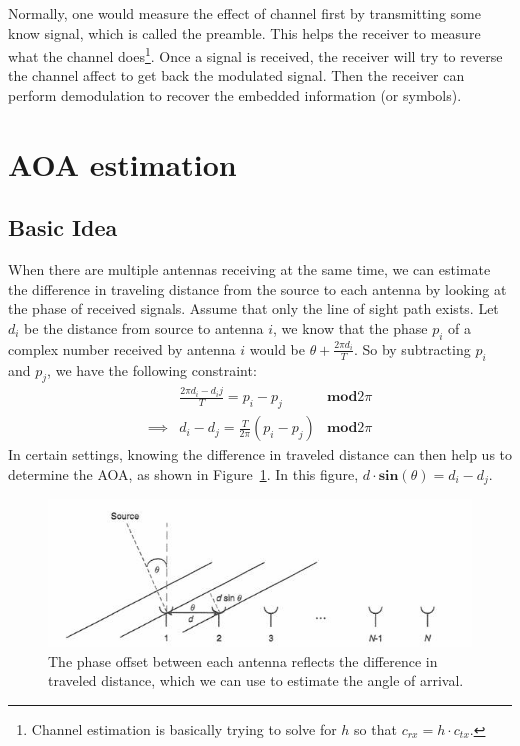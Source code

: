 \documentclass[10pt]{article}
\begin{document}
Normally, one would measure the effect of channel first by transmitting some know signal, which is called the preamble.  This helps the receiver to measure what the channel does\footnote{Channel estimation is basically trying to solve for $h$ so that $c_{rx} = h\cdot c_{tx}$. }.  Once a signal is received, the receiver will try to reverse the channel affect to get back the modulated signal.  Then the receiver can perform demodulation to recover the embedded information (or symbols).


\section{AOA estimation}

\subsection{Basic Idea}
When there are multiple antennas receiving at the same time, we can estimate the difference in traveling distance from the source to each antenna by looking at the phase of received signals.  Assume that only the line of sight path exists.  Let $d_i$ be the distance from source to antenna $i$, we know that the phase $p_i$ of a complex number received by antenna $i$ would be $\theta + \frac{2\pi d_i}{T}$.  So by subtracting $p_i$ and $p_j$, we have the following constraint:
\begin{align}
&\frac{2\pi d_i-d_ij}{T} = p_i - p_j & \textbf{mod}2\pi\\
\implies& d_i-d_j = \frac{T}{2\pi}(p_i - p_j)  & \textbf{mod}2\pi
\end{align}
In certain settings, knowing the difference in traveled distance can then help us to determine the AOA, as shown in Figure~\ref{fig:aoa}.  In this figure, $d\cdot\textbf{sin}(\theta) = d_i-d_j$.

\begin{figure}[h!]
\begin{center}
\includegraphics[width=0.6\linewidth]{figs/AOA}
\end{center}
\caption{The phase offset between each antenna reflects the difference in traveled distance, which we can use to estimate the angle of arrival.}
\label{fig:aoa}
\end{figure}
\end{document}
